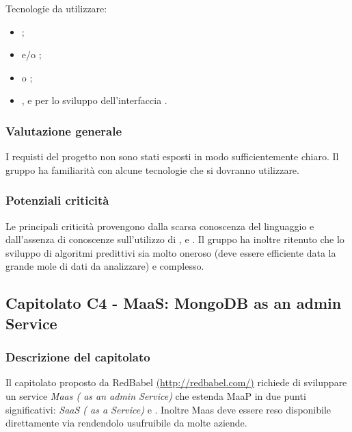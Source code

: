 \documentclass[a4paper, titlepage]{article}
\begin{document}
Tecnologie da utilizzare:
\begin{itemize}
	\item {};
	\item {} e/o ;
	\item {} o ;
	\item {},  e  per lo sviluppo dell'interfaccia .
\end{itemize}

\subsubsection{Valutazione generale}
I requisti del progetto non sono stati esposti in modo sufficientemente chiaro. Il gruppo ha familiarità con alcune tecnologie che si dovranno utilizzare.

\subsubsection{Potenziali criticità}
Le principali criticità provengono dalla scarsa conoscenza del linguaggio  e dall'assenza di conoscenze sull'utilizzo di ,  e .
Il gruppo ha inoltre ritenuto che lo sviluppo di algoritmi predittivi sia molto oneroso (deve essere efficiente data la grande mole di dati da analizzare) e complesso.

\newpage

\subsection{Capitolato C4 - MaaS: MongoDB as an admin Service}

\subsubsection{Descrizione del capitolato}
Il capitolato proposto da RedBabel \href{http://redbabel.com/}{(http://redbabel.com/)} richiede di sviluppare un  service \textit{Maas ( as an admin Service)} che estenda MaaP in due punti significativi: \textit{SaaS ( as a Service)} e \textit{}.
Inoltre Maas deve essere reso disponibile direttamente via  rendendolo usufruibile da molte aziende.
\end{document}
